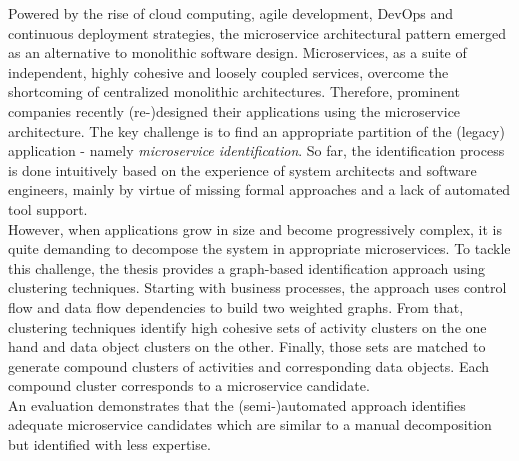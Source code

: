 

\Abstract
Powered by the rise of cloud computing, agile development, DevOps and continuous deployment strategies, the microservice architectural pattern emerged as an alternative to monolithic software design. Microservices, as a suite of independent, highly cohesive and loosely coupled services, overcome the shortcoming of centralized monolithic architectures. Therefore, prominent companies recently (re-)designed their applications using the microservice architecture.
The key challenge is to find an appropriate partition of the (legacy) application - namely \textit{microservice identification}. 
So far, the identification process is done intuitively based on the experience of system architects and software engineers, mainly by virtue of missing formal approaches and a lack of automated tool support. \\
However, when applications grow in size and become progressively complex, it is quite demanding to decompose the system in appropriate microservices.
To tackle this challenge, the thesis provides a graph-based identification approach using clustering techniques. Starting with business processes, the approach uses control flow and data flow dependencies to build two weighted graphs. From that, clustering techniques identify high cohesive sets of activity clusters on the one hand and data object clusters on the other.
Finally, those sets are matched to generate compound clusters of activities and corresponding data objects. Each compound cluster corresponds to a microservice candidate. \\
An evaluation demonstrates that the (semi-)automated approach identifies adequate microservice candidates which are similar to a manual decomposition but identified with less expertise.

